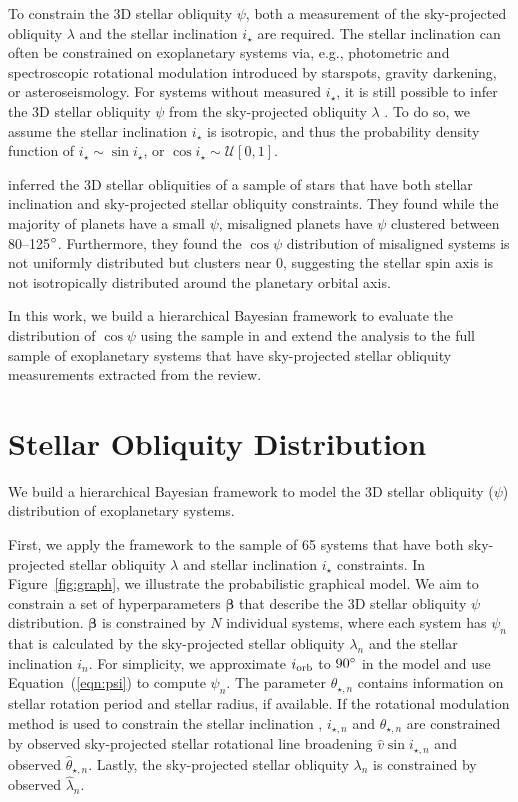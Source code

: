 \documentclass[twocolumn,times]{aastex631}
\newcommand{\numistar}{65\xspace}
\begin{document}
To constrain the 3D stellar obliquity $\psi$, both a measurement of the sky-projected obliquity $\lambda$ and the stellar inclination $i_\star$ are required. The stellar inclination can often be constrained on exoplanetary systems via, e.g., photometric and spectroscopic rotational modulation introduced by starspots, gravity darkening, or asteroseismology. For systems without measured $i_\star$, it is still possible to infer the 3D stellar obliquity $\psi$ from the sky-projected obliquity $\lambda$ \citep[e.g.,][]{Fabrycky09}. To do so, we assume the stellar inclination $i_\star$ is isotropic, and thus the probability density function of ${i_\star} \sim \sin{i_{\star}}$, or $\cos{i_\star} \sim \mathcal{U}[0,1]$.

\cite{Albrecht21} inferred the 3D stellar obliquities of a sample of stars that have both stellar inclination and sky-projected stellar obliquity constraints. They found while the majority of planets have a small $\psi$, misaligned planets have $\psi$ clustered between 80--125$\mbox{$^\circ$}$. Furthermore, they found the $\cos{\psi}$ distribution of misaligned systems is not uniformly distributed but clusters near 0, suggesting the stellar spin axis is not isotropically distributed around the planetary orbital axis.

In this work, we build a hierarchical Bayesian framework to evaluate the distribution of $\cos{\psi}$ using the sample in \cite{Albrecht21} and extend the analysis to the full sample of exoplanetary systems that have sky-projected stellar obliquity measurements extracted from the \cite{Albrecht22} review.

\section{Stellar Obliquity Distribution} \label{sec:hbm}
We build a hierarchical Bayesian framework to model the 3D stellar obliquity ($\psi$) distribution of exoplanetary systems.

First, we apply the framework to the sample of \numistar systems that have both sky-projected stellar obliquity $\lambda$ and stellar inclination $i_\star$ constraints.
In Figure~\ref{fig:graph}, we illustrate the probabilistic graphical model. We aim to constrain a set of hyperparameters $\bm{\beta}$ that describe the 3D stellar obliquity $\psi$ distribution. $\bm{\beta}$ is constrained by $N$ individual systems, where each system has $\psi_n$ that is calculated by the sky-projected stellar obliquity $\lambda_n$ and the stellar inclination $i_n$. For simplicity, we approximate $i_{\rm orb}$ to $90\mbox{$^\circ$}$ in the model and use Equation~(\ref{eqn:psi}) to compute $\psi_n$. 
The parameter $\theta_{\star, n}$ contains information on stellar rotation period and stellar radius, if available.
If the rotational modulation method is used to constrain the stellar inclination \citep[e.g.,][]{Masuda20}, $i_{\star,n}$ and $\theta_{\star,n}$ are constrained by observed sky-projected stellar rotational line broadening $\hat{v}\sin{i_{\star,n}}$ and observed $\hat{\theta}_{\star,n}$. Lastly, the sky-projected stellar obliquity $\lambda_n$ is constrained by observed $\hat{\lambda}_n$.
\end{document}
